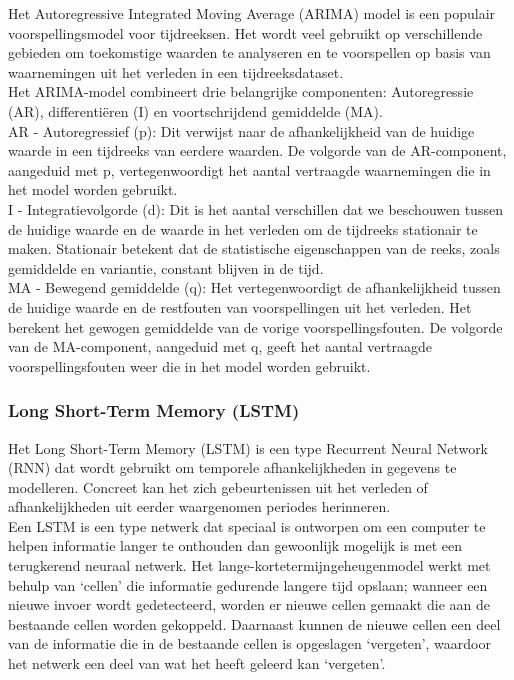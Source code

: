Het Autoregressive Integrated Moving Average (ARIMA) model is een populair voorspellingsmodel voor tijdreeksen. Het wordt veel gebruikt op verschillende gebieden om toekomstige waarden te analyseren en te voorspellen op basis van waarnemingen uit het verleden in een tijdreeksdataset. \\

Het ARIMA-model combineert drie belangrijke componenten: Autoregressie (AR), differentiëren (I) en voortschrijdend gemiddelde (MA). \\

AR - Autoregressief (p): Dit verwijst naar de afhankelijkheid van de huidige waarde in een tijdreeks van eerdere waarden. De volgorde van de AR-component, aangeduid met p, vertegenwoordigt het aantal vertraagde waarnemingen die in het model worden gebruikt. \\

I - Integratievolgorde (d): Dit is het aantal verschillen dat we beschouwen tussen de huidige waarde en de waarde in het verleden om de tijdreeks stationair te maken. Stationair betekent dat de statistische eigenschappen van de reeks, zoals gemiddelde en variantie, constant blijven in de tijd. \\

MA - Bewegend gemiddelde (q): Het vertegenwoordigt de afhankelijkheid tussen de huidige waarde en de restfouten van voorspellingen uit het verleden. Het berekent het gewogen gemiddelde van de vorige voorspellingsfouten. De volgorde van de MA-component, aangeduid met q, geeft het aantal vertraagde voorspellingsfouten weer die in het model worden gebruikt.

\subsubsection{Long Short-Term Memory (LSTM)}

Het Long Short-Term Memory (LSTM) is een type Recurrent Neural Network (RNN) dat wordt gebruikt om temporele afhankelijkheden in gegevens te modelleren. Concreet kan het zich gebeurtenissen uit het verleden of afhankelijkheden uit eerder waargenomen periodes herinneren. \\

Een LSTM is een type netwerk dat speciaal is ontworpen om een computer te helpen informatie langer te onthouden dan gewoonlijk mogelijk is met een terugkerend neuraal netwerk. Het lange-kortetermijngeheugenmodel werkt met behulp van ‘cellen’ die informatie gedurende langere tijd opslaan; wanneer een nieuwe invoer wordt gedetecteerd, worden er nieuwe cellen gemaakt die aan de bestaande cellen worden gekoppeld. Daarnaast kunnen de nieuwe cellen een deel van de informatie die in de bestaande cellen is opgeslagen ‘vergeten’, waardoor het netwerk een deel van wat het heeft geleerd kan ‘vergeten’. \\

